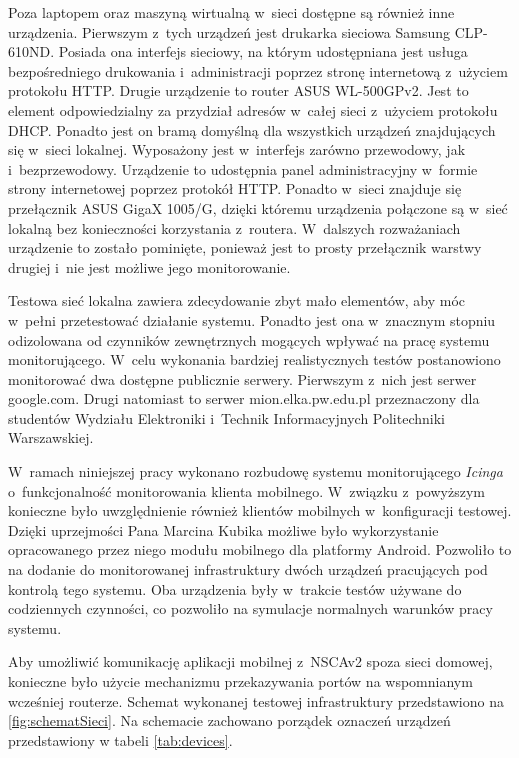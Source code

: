 Poza laptopem oraz maszyną wirtualną w~sieci dostępne są również inne
urządzenia. Pierwszym z~tych urządzeń jest drukarka sieciowa Samsung
CLP-610ND. Posiada ona interfejs sieciowy, na którym udostępniana jest
usługa bezpośredniego drukowania i~administracji poprzez stronę
internetową z~użyciem protokołu HTTP. Drugie urządzenie to router ASUS
WL-500GPv2. Jest to element odpowiedzialny za przydział adresów
w~całej sieci z~użyciem protokołu DHCP. Ponadto jest on bramą domyślną
dla wszystkich urządzeń znajdujących się w~sieci lokalnej. Wyposażony
jest w~interfejs zarówno przewodowy, jak i~bezprzewodowy. Urządzenie
to udostępnia panel administracyjny w~formie strony internetowej
poprzez protokół HTTP. Ponadto w~sieci znajduje się przełącznik ASUS
GigaX 1005/G, dzięki któremu urządzenia połączone są w~sieć lokalną
bez konieczności korzystania z~routera. W~dalszych rozważaniach
urządzenie to zostało pominięte, ponieważ jest to prosty przełącznik
warstwy drugiej i~nie jest możliwe jego monitorowanie.

Testowa sieć lokalna zawiera zdecydowanie zbyt mało elementów, aby móc
w~pełni przetestować działanie systemu. Ponadto jest ona w~znacznym
stopniu odizolowana od czynników zewnętrznych mogących wpływać na
pracę systemu monitorującego. W~celu wykonania bardziej realistycznych
testów postanowiono monitorować dwa dostępne publicznie
serwery. Pierwszym z~nich jest serwer google.com. Drugi natomiast to
serwer mion.elka.pw.edu.pl przeznaczony dla studentów Wydziału
Elektroniki i~Technik Informacyjnych Politechniki Warszawskiej.

W~ramach niniejszej pracy wykonano rozbudowę systemu monitorującego
{\em Icinga} o~funkcjonalność monitorowania klienta mobilnego. W~związku
z~powyższym konieczne było uwzględnienie również klientów mobilnych
w~konfiguracji testowej. Dzięki uprzejmości Pana Marcina Kubika
możliwe było wykorzystanie opracowanego przez niego modułu mobilnego
dla platformy Android. Pozwoliło to na dodanie do monitorowanej
infrastruktury dwóch urządzeń pracujących pod kontrolą tego
systemu. Oba urządzenia były w~trakcie testów używane do codziennych
czynności, co pozwoliło na symulacje normalnych warunków pracy
systemu.

Aby umożliwić komunikację aplikacji mobilnej z~NSCAv2 spoza sieci
domowej, konieczne było użycie mechanizmu przekazywania portów na
wspomnianym wcześniej routerze. Schemat wykonanej testowej
infrastruktury przedstawiono na \ref{fig:schematSieci}. Na schemacie
zachowano porządek oznaczeń urządzeń przedstawiony w tabeli
\ref{tab:devices}.

